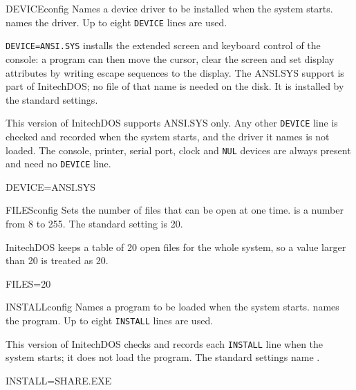 \begin{DosEntry}{DEVICE}{}{config}
\Purpose Names a device driver to be installed when the system starts.
\Format {}
\Remarks
{} names the driver.  Up to eight \texttt{DEVICE} lines are
used.

\texttt{DEVICE=ANSI.SYS} installs the extended screen and keyboard control
of the console: a program can then move the cursor, clear the screen and
set display attributes by writing escape sequences to the display.  The
ANSI.SYS support is part of InitechDOS; no file of that name is needed on
the disk.  It is installed by the standard settings.

This version of InitechDOS supports ANSI.SYS only.  Any other
\texttt{DEVICE} line is checked and recorded when the system starts, and the
driver it names is not loaded.  The console, printer, serial port, clock and
\texttt{NUL} devices are always present and need no \texttt{DEVICE} line.
\Example
\begin{TypeIn}
DEVICE=ANSI.SYS
\end{TypeIn}
\end{DosEntry}

\begin{DosEntry}{FILES}{}{config}
\Purpose Sets the number of files that can be open at one time.
\Format {}
\Remarks
{} is a number from 8 to 255.  The standard setting is 20.

InitechDOS keeps a table of 20 open files for the whole system, so a value
larger than 20 is treated as 20.
\Example
\begin{TypeIn}
FILES=20
\end{TypeIn}
\end{DosEntry}

\begin{DosEntry}{INSTALL}{}{config}
\Purpose Names a program to be loaded when the system starts.
\Format {}
\Remarks
{} names the program.  Up to eight \texttt{INSTALL} lines are
used.

This version of InitechDOS checks and records each \texttt{INSTALL} line
when the system starts; it does not load the program.  The standard
settings name .
\Example
\begin{TypeIn}
INSTALL=SHARE.EXE
\end{TypeIn}
\end{DosEntry}

